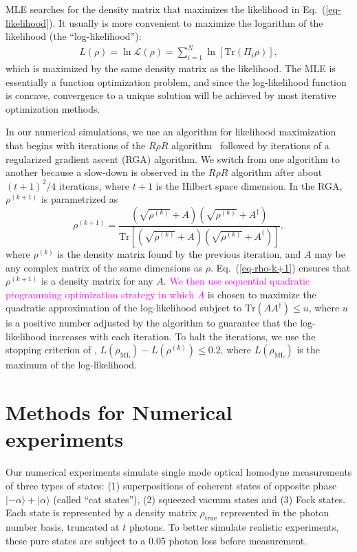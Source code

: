 \documentclass[
reprint,
superscriptaddress,
showpacs,
amsmath,
amssymb,
aps,
pra,
longbibliography
]{revtex4-1}
\providecommand{\editcolor}[2]{\textcolor{#1}{#2}}
\providecommand{\editcolor}[2]{#2}
\newcommand{\SG}[1]{\editcolor{magenta}{#1}}
\begin{document}
MLE searches for the density matrix that maximizes the likelihood
in Eq.~(\ref{eq-likelihood}). It usually is
more convenient to maximize the logarithm of the likelihood (the
``log-likelihood''):
\begin{eqnarray}
  L (\rho) = \ln \mathcal{L} (\rho)= \sum_{i=1}^{N} \ln [\mathrm{Tr} (\Pi_i \rho)],
\end{eqnarray} 
which is maximized by the same density matrix as the likelihood. The
MLE is essentially a function optimization problem, and since the
log-likelihood function is concave, convergence to a unique solution
will be achieved by most iterative optimization methods.

In our numerical simulations, we use an algorithm for likelihood
maximization that begins with iterations of the $R\rho R$
algorithm~\cite{Rehacek2007} followed by iterations of a regularized
gradient ascent (RGA) algorithm. We switch from one algorithm to another 
because a slow-down is observed in the $R\rho R$ algorithm
after about $(t+1)^2/4$ iterations, where $t+1$ is the Hilbert
  space dimension. In the RGA, $\rho^{(k+1)}$ is parametrized as
\begin{equation}
  \rho^{(k+1)}=\frac{\left(\sqrt{\rho^{(k)}}+A\right)\left(\sqrt{\rho^{(k)}}+A^{\dagger}\right)}{\mathrm{Tr}\left[\left(\sqrt{\rho^{(k)}}+A\right)\left(\sqrt{\rho^{(k)}}+A^{\dagger}\right)\right]},
  \label{eq-rho-k+1}
\end{equation}
where $\rho^{(k)}$ is the density matrix found by the previous
iteration, and $A$ may be any complex matrix of the same dimensions as
$\rho$. Eq.~(\ref{eq-rho-k+1}) ensures that $\rho^{(k+1)}$ is a
density matrix for any $A$. \SG{We then use sequential quadratic
  programming optimization strategy \cite{Nocedal2006} in which $A$}
is chosen to maximize the quadratic approximation of the
log-likelihood subject to $\text{Tr}(AA^{\dagger})\leq u$, where $u$
is a positive number adjusted by the algorithm to guarantee that the
log-likelihood increases with each iteration. To halt the iterations,
we use the stopping criterion of \cite{Glancy2012},
$L(\rho_{\text{ML}})-L(\rho^{(k)})\leq 0.2$, where
$L(\rho_{\text{ML}})$ is the maximum of the log-likelihood.



\section{Methods for Numerical experiments}
\label{numerical-experiments}
Our numerical experiments simulate single mode optical
homodyne measurements of three types of states: (1) superpositions of coherent states of opposite phase $|-\alpha\rangle + |\alpha\rangle$ (called ``cat states''), (2) squeezed vacuum states and (3) Fock states.  
Each state is represented by a density matrix $\rho_{\mathrm{true}}$ 
represented in the photon number basis, truncated at $t$ photons. To better simulate realistic experiments, these pure states are subject to a 0.05 
photon loss before measurement. 
\end{document}
